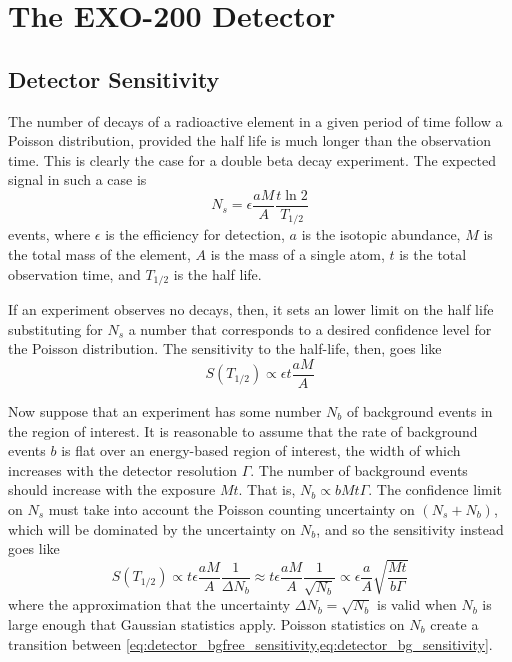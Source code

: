 \documentclass[herrin-thesis.tex]{subfiles}
\begin{document}
\chapter{The EXO-200 Detector}
\label{ch:detector}

\section{Detector Sensitivity}
The number of decays of a radioactive element in a given period of time follow a Poisson distribution, provided the half life is much longer than the observation time. This is clearly the case for a double beta decay experiment. The expected signal in such a case is
\begin{equation}
N_{s} = \epsilon \frac{a M}{A} \frac{t \ln2}{T_{1/2}}
\label{eq:detector_N_expected}
\end{equation}
events, where  \(\epsilon\) is the efficiency for detection, \(a\) is the isotopic abundance, \(M\) is the total mass of the element, \(A\) is the mass of a single atom, \(t\) is the total observation time, and \(T_{1/2}\) is the half life.

If an experiment observes no decays, then, it sets an lower limit on the half life substituting for \(N_s\) a number that corresponds to a desired confidence level for the Poisson distribution. The sensitivity to the half-life, then, goes like
\begin{equation}
S(T_{1/2}) \propto \epsilon t \frac{a M}{A}
\label{eq:detector_bgfree_sensitivity}
\end{equation}

Now suppose that an experiment has some number \(N_b\) of background events in the region of interest. It is reasonable to assume that the rate of background events \(b\) is flat over an energy-based region of interest, the width of which increases with the detector resolution \(\Gamma\). The number of background events should increase with the exposure \(M t\). That is, \(N_b \propto b M t \Gamma\). The confidence limit on \(N_s\) must take into account the Poisson counting uncertainty on \((N_s + N_b)\), which will be dominated by the uncertainty on \(N_b\), and so the sensitivity instead goes like
\begin{equation}
S(T_{1/2}) \propto t \epsilon \frac{a M}{A} \frac{1}{\Delta N_b} \approx t \epsilon \frac{a M}{A} \frac{1}{\sqrt{N_b}} \propto \epsilon \frac{a}{A} \sqrt{\frac{M t}{b \Gamma}}
\label{eq:detector_bg_sensitivity}
\end{equation}
where the approximation that the uncertainty \(\Delta N_b = \sqrt{N_b}\) is valid when \(N_b\) is large enough that Gaussian statistics apply. Poisson statistics on \(N_b\) create a transition between \cref{eq:detector_bgfree_sensitivity,eq:detector_bg_sensitivity}.
\end{document}
